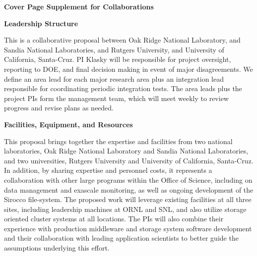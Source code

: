 \newpage

\begin{center}
\textbf{\huge Cover Page Supplement for Collaborations}
\end{center}



%
\begin{center}
\textbf{\large Leadership Structure}
\end{center}


This is a collaborative proposal between 
Oak Ridge National Laboratory, and
Sandia National Laboratories, and
Rutgers University, and
University of California, Santa-Cruz. 
PI Klasky will be responsible for project oversight, reporting to DOE, and
final decision making in event of major disagreements.
We define an area lead for each major research area plus
an integration lead responsible for coordinating periodic integration tests. The area leads plus the project PIs
form the management team, which will meet weekly to review progress and revise plans as needed.




\begin{center}
\textbf{\large Facilities, Equipment, and Resources}
\end{center}
This proposal brings together the expertise and facilities from two
national laboratories, Oak Ridge National Laboratory and Sandia National
Laboratories, and two universities, Rutgers University and University of
California, Santa-Cruz. 
 In addition, by
sharing expertise and personnel costs, it represents
a collaboration with other large programs within the Office of
Science, including on data management and exascale monitoring, as well as
ongoing development of the Sirocco file-system. 
The proposed work will leverage existing facilities at all three
sites, including leadership machines at ORNL and SNL, and also utilize
storage oriented cluster systems at all locations. The PIs will also combine
their experience with production middleware and storage system software
development and their collaboration with leading application scientists to
better guide the assumptions underlying this effort. 

